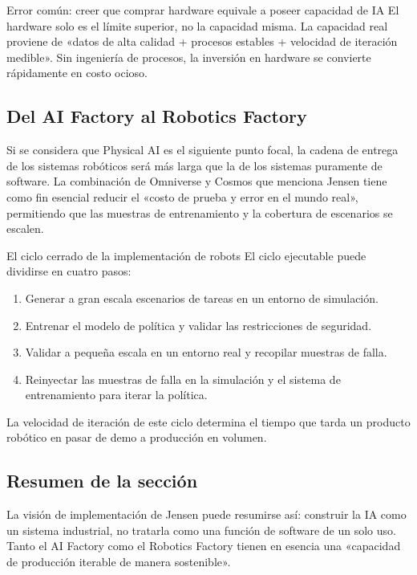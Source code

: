 \documentclass[a4paper]{article}
\begin{document}
\begin{warningbox}{Error común: creer que comprar hardware equivale a poseer capacidad de IA}
El hardware solo es el límite superior, no la capacidad misma. La capacidad real proviene de «datos de alta calidad + procesos estables + velocidad de iteración medible». Sin ingeniería de procesos, la inversión en hardware se convierte rápidamente en costo ocioso.
\end{warningbox}

\subsection{Del AI Factory al Robotics Factory}

Si se considera que Physical AI es el siguiente punto focal, la cadena de entrega de los sistemas robóticos será más larga que la de los sistemas puramente de software. La combinación de Omniverse y Cosmos que menciona Jensen tiene como fin esencial reducir el «costo de prueba y error en el mundo real», permitiendo que las muestras de entrenamiento y la cobertura de escenarios se escalen.

\begin{importantbox}{El ciclo cerrado de la implementación de robots}
El ciclo ejecutable puede dividirse en cuatro pasos:
\begin{enumerate}
    \item Generar a gran escala escenarios de tareas en un entorno de simulación.
    \item Entrenar el modelo de política y validar las restricciones de seguridad.
    \item Validar a pequeña escala en un entorno real y recopilar muestras de falla.
    \item Reinyectar las muestras de falla en la simulación y el sistema de entrenamiento para iterar la política.
\end{enumerate}
La velocidad de iteración de este ciclo determina el tiempo que tarda un producto robótico en pasar de demo a producción en volumen.
\end{importantbox}

\subsection{Resumen de la sección}
La visión de implementación de Jensen puede resumirse así: construir la IA como un sistema industrial, no tratarla como una función de software de un solo uso. Tanto el AI Factory como el Robotics Factory tienen en esencia una «capacidad de producción iterable de manera sostenible».
\end{document}
